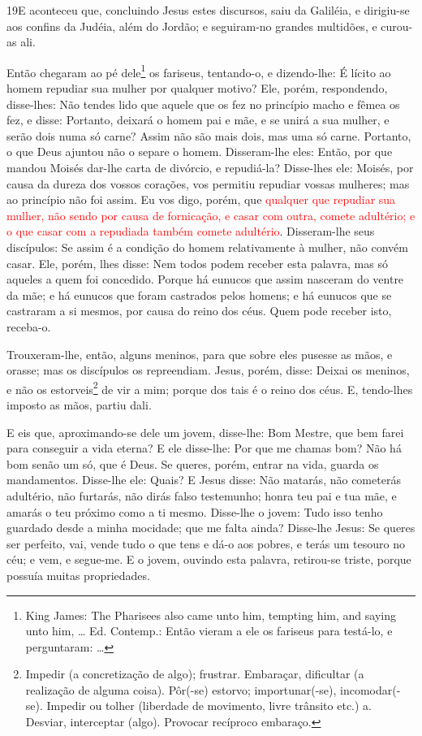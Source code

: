 \medskip

\lettrine{19} E aconteceu que, concluindo Jesus estes
discursos, saiu da Galiléia, e dirigiu-se aos confins da Judéia,
além do Jordão; e seguiram-no grandes multidões, e curou-as
ali.

Então chegaram ao pé dele\footnote{King James: The Pharisees also
came unto him, tempting him, and saying unto him, \ldots{} Ed.
Contemp.: Então vieram a ele os fariseus para testá-lo, e
perguntaram: \ldots{}} os fariseus, tentando-o, e dizendo-lhe: É
lícito ao homem repudiar sua mulher por qualquer motivo? Ele,
porém, respondendo, disse-lhes: Não tendes lido que aquele que os
fez no princípio macho e fêmea os fez, e disse: Portanto,
deixará o homem pai e mãe, e se unirá a sua mulher, e serão dois
numa só carne? Assim não são mais dois, mas uma só carne.
Portanto, o que Deus ajuntou não o separe o homem. Disseram-lhe
eles: Então, por que mandou Moisés dar-lhe carta de divórcio, e
repudiá-la? Disse-lhes ele: Moisés, por causa da dureza dos
vossos corações, vos permitiu repudiar vossas mulheres; mas ao
princípio não foi assim. Eu vos digo, porém, que
\textcolor{red}{qualquer que repudiar sua mulher, não sendo por causa de
fornicação, e casar com outra, comete adultério; e o que casar com a
repudiada também comete adultério}. Disseram-lhe seus
discípulos: Se assim é a condição do homem relativamente à mulher,
não convém casar. Ele, porém, lhes disse: Nem todos podem
receber esta palavra, mas só aqueles a quem foi concedido.
Porque há eunucos que assim nasceram do ventre da mãe; e há
eunucos que foram castrados pelos homens; e há eunucos que se
castraram a si mesmos, por causa do reino dos céus. Quem pode
receber isto, receba-o.

Trouxeram-lhe, então, alguns meninos, para que sobre eles pusesse
as mãos, e orasse; mas os discípulos os repreendiam. Jesus,
porém, disse: Deixai os meninos, e não os estorveis\footnote{Impedir
(a concretização de algo); frustrar. Embaraçar, dificultar (a
realização de alguma coisa).  Pôr(-se) estorvo; importunar(-se),
incomodar(-se). Impedir ou tolher (liberdade de movimento, livre
trânsito etc.) a. Desviar, interceptar (algo). Provocar recíproco
embaraço.} de vir a mim; porque dos tais é o reino dos céus.
E, tendo-lhes imposto as mãos, partiu dali.

E eis que, aproximando-se dele um jovem, disse-lhe: Bom Mestre,
que bem farei para conseguir a vida eterna? E ele disse-lhe:
Por que me chamas bom? Não há bom senão um só, que é Deus. Se
queres, porém, entrar na vida, guarda os mandamentos.
Disse-lhe ele: Quais? E Jesus disse: Não matarás, não
cometerás adultério, não furtarás, não dirás falso testemunho;
honra teu pai e tua mãe, e amarás o teu próximo como a ti
mesmo. Disse-lhe o jovem: Tudo isso tenho guardado desde a
minha mocidade; que me falta ainda? Disse-lhe Jesus: Se
queres ser perfeito, vai, vende tudo o que tens e dá-o aos pobres, e
terás um tesouro no céu; e vem, e segue-me. E o jovem,
ouvindo esta palavra, retirou-se triste, porque possuía muitas
propriedades.

